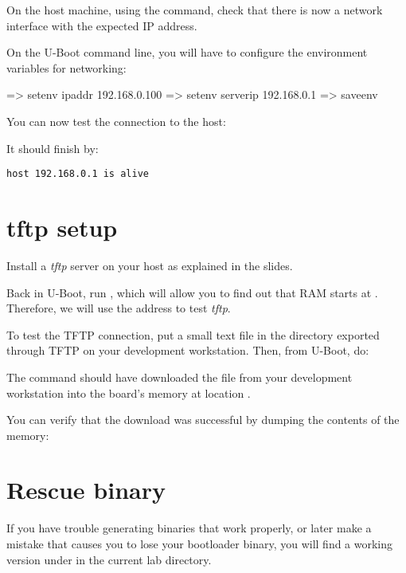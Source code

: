 On the host machine, using the  command, check that
there is now a  network interface with the expected IP
address.

On the U-Boot command line, you will have to configure the environment
variables for networking:

\begin{ubootinput}
=> setenv ipaddr 192.168.0.100
=> setenv serverip 192.168.0.1
=> saveenv
\end{ubootinput}

You can now test the connection to the host:

It should finish by:
\begin{verbatim}
host 192.168.0.1 is alive
\end{verbatim}

\section{tftp setup}

Install a {\em tftp} server on your host as explained in the slides.

Back in U-Boot, run , which will allow you to find out that
RAM starts at . Therefore, we will use the 
address to test {\em tftp}.

To test the TFTP connection, put a small text file in
the directory exported through TFTP on your development
workstation. Then, from U-Boot, do:


The  command should have downloaded the
 file from your development workstation into
the board's memory at location .

You can verify that the download was successful by dumping the
contents of the memory:


\section{Rescue binary}

If you have trouble generating binaries that work properly, or later
make a mistake that causes you to lose your bootloader binary, you
will find a working version under  in the current lab
directory.
